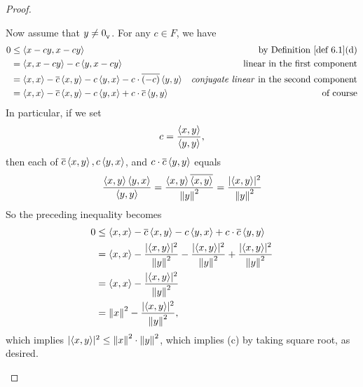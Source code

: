 \begin{proof}
\begin{enumerate}
Now assume that \(y \ne 0_{_{\textsf{V}}}\).
For any \(c \in F\), we have
\begin{align*}
    0 & \le \LG x - cy, x - cy \RG & \text{by \DEF{6.1}(d)} \\
      & = \LG x, x - cy \RG - c \LG y, x - cy \RG & \text{linear in the first component} \\
      & = \LG x, x \RG - \conjugatet{c} \LG x, y \RG - c \LG y, x \RG - c \cdot \conjugatet{(-c)} \LG y, y \RG & \text{\emph{conjugate linear} in the second component} \\
      & = \LG x, x \RG - \conjugatet{c} \LG x, y \RG - c \LG y, x \RG + c \cdot \conjugatet{c} \LG y, y \RG & \text{of course}
\end{align*}
In particular, if we set
\[
    c = \frac{\left< x, y \right>}{\left< y, y \right>},
\]
then each of \(\overline{c} \left< x, y \right>, c \left< y, x \right>\), and \(c \cdot \overline{c} \left< y, y \right>\) equals
\[
    \frac{\left< x, y \right> \left< y, x \right>}{\left< y, y \right>}
    = \frac{\left< x, y \right> \overline{\left< x, y \right>}}{\left\lVert y\right\rVert^2}
    = \frac{\lvert \left< x, y \right> \rvert^2}{\left\lVert y\right\rVert^2}
\]
So the preceding inequality becomes
\begin{align*}
    0 & \le \left< x, x \right> - \overline{c} \left< x, y \right> - c \left< y, x \right> + c \cdot \overline{c} \left< y, y \right> \\
      & = \left< x, x \right> - \frac{\lvert \left< x, y \right> \rvert^2}{\left\lVert y\right\rVert^2} - \frac{\lvert \left< x, y \right> \rvert^2}{\left\lVert y\right\rVert^2} + \frac{\lvert \left< x, y \right> \rvert^2}{\left\lVert y\right\rVert^2} \\
      & = \left< x, x \right> - \frac{\lvert \left< x, y \right> \rvert^2}{\left\lVert y\right\rVert^2} \\
      & = \left\lVert x\right\rVert^2 - \frac{\lvert \left< x, y \right> \rvert^2}{\left\lVert y\right\rVert^2},
\end{align*}
which implies \(\lvert \left< x, y \right> \rvert^2 \le \left\lVert x\right\rVert^2 \cdot \left\lVert y\right\rVert^2\), which implies (c) by taking square root, as desired.


\end{enumerate}
\end{proof}
